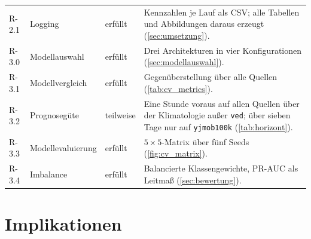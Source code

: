 \begin{table}[H]
\begin{tabularx}{\textwidth}{@{}l l l X@{}}
        \addlinespace
        R-2.1 & Logging & erfüllt & Kennzahlen je Lauf als CSV; alle Tabellen und Abbildungen daraus erzeugt (\cref{sec:umsetzung}). \\
        \addlinespace
        R-3.0 & Modellauswahl & erfüllt & Drei Architekturen in vier Konfigurationen (\cref{sec:modellauswahl}). \\
        \addlinespace
        R-3.1 & Modellvergleich & erfüllt & Gegenüberstellung über alle Quellen (\cref{tab:cv_metrics}). \\
        \addlinespace
        R-3.2 & Prognosegüte & teilweise & Eine Stunde voraus auf allen Quellen über der Klimatologie außer \texttt{ved}; über sieben Tage nur auf \texttt{yjmob100k} (\cref{tab:horizont}). \\
        \addlinespace
        R-3.3 & Modellevaluierung & erfüllt & $5\times5$-Matrix über fünf Seeds (\cref{fig:cv_matrix}). \\
        \addlinespace
        R-3.4 & Imbalance & erfüllt & Balancierte Klassengewichte, PR-AUC als Leitmaß (\cref{sec:bewertung}). \\
        \bottomrule
    \end{tabularx}
\end{table}

\section{Implikationen}
\label{sec:implikationen}

